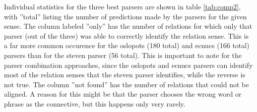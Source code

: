 \documentclass[10pt,notitlepage]{scrartcl}
\begin{document}
\begin{table}[htbp]
\centering
{}
\caption{Sense agreement (implicit and explicit) between oslopots, ecnucs and steven}
\label{tab:comp1}
\end{table}

Individual statistics for the three best parsers are shown in table \ref{tab:comp2}, with ''total'' listing the number of predictions made by the parsers for the given sense. The column labeled ''only'' has the number of relations for which only that parser (out of the three) was able to correctly identify the relation sense. This is a far more common occurence for the oslopots (180 total) and ecnucs (166 total) parsers than for the steven parser (56 total). This is important to note for the parser combination approaches, since the oslopots and ecnucs parsers can identify most of the relation senses that the steven parser identifies, while the reverse is not true. The column ''not found'' has the number of relations that could not be aligned.  A reason for this might be that the parser chooses the wrong word or phrase as the connective, but this happens only very rarely.
\end{document}

